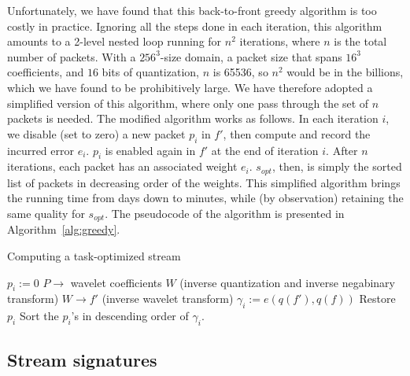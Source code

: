 Unfortunately, we have found that this back-to-front greedy algorithm is too costly in practice.
Ignoring all the steps done in each iteration, this algorithm amounts to a 2-level nested loop
running for $n^2$ iterations, where $n$ is the total number of packets. With a $256^3$-size domain,
a packet size that spans $16^3$ coefficients, and $16$ bits of quantization, $n$ is 65536, so $n^2$
would be in the billions, which we have found to be prohibitively large. We have therefore adopted a
simplified version of this algorithm, where only one pass through the set of $n$ packets is needed.
The modified algorithm works as follows. In each iteration $i$, we disable (set to zero) a new
packet $p_i$ in $f'$, then compute and record the incurred error $e_i$. $p_i$ is enabled again in
$f'$ at the end of iteration $i$. After $n$ iterations, each packet has an associated weight $e_i$.
$s_{opt}$, then, is simply the sorted list of packets in decreasing order of the weights. This
simplified algorithm brings the running time from days down to minutes, while (by observation)
retaining the same quality for $s_{opt}$. The pseudocode of the algorithm is presented in
Algorithm~\cref{alg:greedy}.

\begin{algorithm}[h]
  \small
  \caption{Computing a task-optimized stream}
  \begin{algorithmic}[1]
			\State $p_i := 0$
      \State $P \rightarrow$ wavelet coefficients $W$ (inverse quantization and inverse negabinary transform)
			\State $W \rightarrow f'$ (inverse wavelet transform)
			\State $\gamma_i := e(q(f'),q(f))$			
			\State Restore $p_i$
		\EndFor
		\State Sort the $p_i$'s in descending order of $\gamma_i$.
	\end{algorithmic}
	\label{alg:greedy}
\end{algorithm}

\subsection{Stream signatures}\label{sec:stream-signature}

